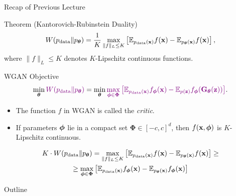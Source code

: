 \documentclass{beamer}
\begin{document}
\begin{frame}{Recap of Previous Lecture}
	\begin{block}{Theorem (Kantorovich-Rubinstein Duality)}
		\vspace{-0.2cm}
		\[
		W(p_{\text{data}} \| p_{\boldsymbol{\theta}}) = \frac{1}{K} \max_{\| f \|_L \leq K} \left[ \mathbb{E}_{p_{\text{data}}(\mathbf{x})} f(\mathbf{x})  - \mathbb{E}_{p_{\boldsymbol{\theta}}(\mathbf{x})} f(\mathbf{x})\right],
		\]
		where $\| f \|_L \leq K$ denotes $K$-Lipschitz continuous functions.
	\end{block}
	\begin{block}{WGAN Objective}
		\vspace{-0.5cm}
		\[
		\min_{\boldsymbol{\theta}} {\color{violet}W(p_{\text{data}} \| p_{\boldsymbol{\theta}})} = \min_{\boldsymbol{\theta}} {\color{violet}\max_{\boldsymbol{\phi} \in \boldsymbol{\Phi}} \left[ \mathbb{E}_{p_{\text{data}}(\mathbf{x})} f_{\boldsymbol{\phi}}(\mathbf{x})  - \mathbb{E}_{p(\mathbf{z})} f_{\boldsymbol{\phi}}(\mathbf{G}_{\boldsymbol{\theta}}(\mathbf{z}))\right]}.
		\]
		\vspace{-0.5cm}
	\end{block}
	\begin{itemize}
		\item The function $f$ in WGAN is called the \textit{critic}.
		\item If parameters $\boldsymbol{\phi}$ lie in a compact set $\boldsymbol{\Phi} \in [-c, c]^d$, then $f(\mathbf{x}, \boldsymbol{\phi})$ is $K$-Lipschitz continuous. 
	\end{itemize}
	\begin{multline*}
		K \cdot W(p_{\text{data}} \| p_{\boldsymbol{\theta}}) = \max_{\| f \|_L \leq K} \left[ \mathbb{E}_{p_{\text{data}}(\mathbf{x})} f(\mathbf{x}) - \mathbb{E}_{p_{\boldsymbol{\theta}}(\mathbf{x})} f(\mathbf{x})\right] \geq 
		\\ \geq \max_{\boldsymbol{\phi} \in \boldsymbol{\Phi}} \left[ \mathbb{E}_{p_{\text{data}}(\mathbf{x})} f_{\boldsymbol{\phi}}(\mathbf{x})  - \mathbb{E}_{p_{\boldsymbol{\theta}}(\mathbf{x})} f_{\boldsymbol{\phi}}(\mathbf{x})\right]
	\end{multline*}
\end{frame}
\begin{frame}{Outline}
	\tableofcontents
\end{frame}
\end{document}

